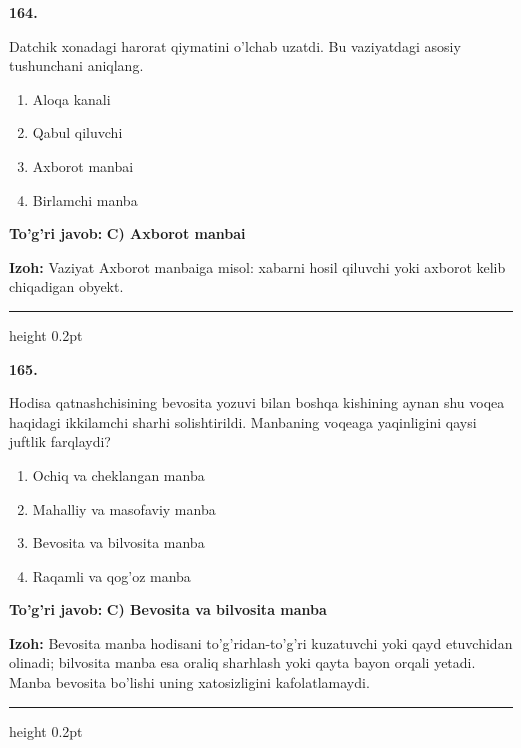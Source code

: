 \documentclass[10pt,a4paper,oneside]{article}
\begin{document}
\noindent\textbf{\color{ink}164.}
\par
Datchik xonadagi harorat qiymatini o'lchab uzatdi. Bu vaziyatdagi asosiy tushunchani aniqlang.
\begin{enumerate}[label=\Alph*),leftmargin=9mm]
\item Aloqa kanali
\item Qabul qiluvchi
\item Axborot manbai
\item Birlamchi manba
\end{enumerate}
\begin{tcolorbox}[enhanced,breakable,colback=teal!4,colframe=teal!50!black,boxrule=0.5pt,arc=1.1mm,left=3mm,right=3mm,top=1.7mm,bottom=1.7mm,before skip=2mm,after skip=2mm]
\textbf{\color{teal}To'g'ri javob:} \textbf{C) Axborot manbai}
\par\smallskip
\textbf{Izoh:} Vaziyat Axborot manbaiga misol: xabarni hosil qiluvchi yoki axborot kelib chiqadigan obyekt.
\end{tcolorbox}
\vspace{2mm}\hrule height 0.2pt \vspace{3mm}

\noindent\textbf{\color{ink}165.}
\par
Hodisa qatnashchisining bevosita yozuvi bilan boshqa kishining aynan shu voqea haqidagi ikkilamchi sharhi solishtirildi. Manbaning voqeaga yaqinligini qaysi juftlik farqlaydi?
\begin{enumerate}[label=\Alph*),leftmargin=9mm]
\item Ochiq va cheklangan manba
\item Mahalliy va masofaviy manba
\item Bevosita va bilvosita manba
\item Raqamli va qog'oz manba
\end{enumerate}
\begin{tcolorbox}[enhanced,breakable,colback=teal!4,colframe=teal!50!black,boxrule=0.5pt,arc=1.1mm,left=3mm,right=3mm,top=1.7mm,bottom=1.7mm,before skip=2mm,after skip=2mm]
\textbf{\color{teal}To'g'ri javob:} \textbf{C) Bevosita va bilvosita manba}
\par\smallskip
\textbf{Izoh:} Bevosita manba hodisani to'g'ridan-to'g'ri kuzatuvchi yoki qayd etuvchidan olinadi; bilvosita manba esa oraliq sharhlash yoki qayta bayon orqali yetadi. Manba bevosita bo'lishi uning xatosizligini kafolatlamaydi.
\end{tcolorbox}
\vspace{2mm}\hrule height 0.2pt \vspace{3mm}
\end{document}
